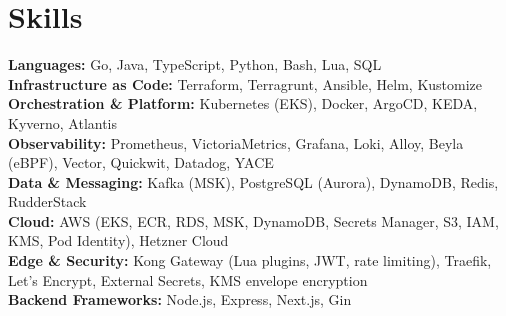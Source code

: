 \documentclass[letterpaper,11pt]{article}
\begin{document}
\section{Skills}
\begin{itemize}[leftmargin=0.15in, label={}]
  \small{\item{
    \textbf{Languages:} Go, Java, TypeScript, Python, Bash, Lua, SQL \\
    \textbf{Infrastructure as Code:} Terraform, Terragrunt, Ansible, Helm, Kustomize \\
    \textbf{Orchestration \& Platform:} Kubernetes (EKS), Docker, ArgoCD, KEDA, Kyverno, Atlantis \\
    \textbf{Observability:} Prometheus, VictoriaMetrics, Grafana, Loki, Alloy, Beyla (eBPF), Vector, Quickwit, Datadog, YACE \\
    \textbf{Data \& Messaging:} Kafka (MSK), PostgreSQL (Aurora), DynamoDB, Redis, RudderStack \\
    \textbf{Cloud:} AWS (EKS, ECR, RDS, MSK, DynamoDB, Secrets Manager, S3, IAM, KMS, Pod Identity), Hetzner Cloud \\
    \textbf{Edge \& Security:} Kong Gateway (Lua plugins, JWT, rate limiting), Traefik, Let's Encrypt, External Secrets, KMS envelope encryption \\
    \textbf{Backend Frameworks:} Node.js, Express, Next.js, Gin
  }}
\end{itemize}
\end{document}
